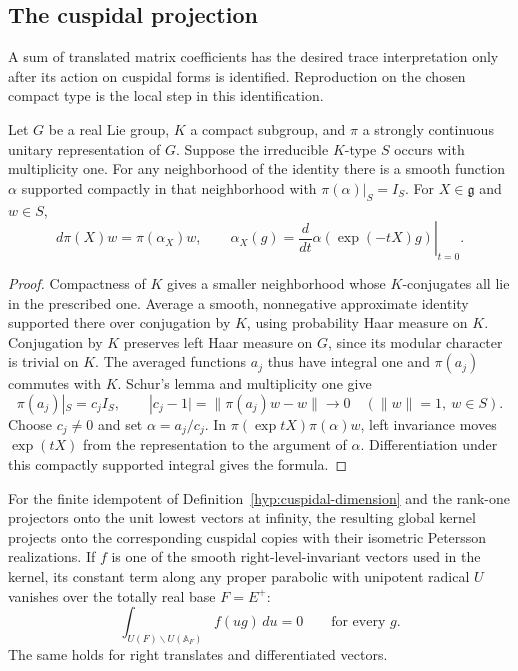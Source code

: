\subsection{The cuspidal projection}\label{sec:count-projection}

A sum of translated matrix coefficients has the desired trace interpretation only after its action on cuspidal forms is identified. Reproduction on the chosen compact type is the local step in this identification.

\begin{auxlemma}
\label{lem:compact-type-reproducer}
Let \(G\) be a real Lie group, \(K\) a compact subgroup, and \(\pi\)
a strongly continuous unitary representation of \(G\). Suppose the
irreducible \(K\)-type \(S\) occurs with multiplicity one.
For any neighborhood of the identity there is a smooth function
\(\alpha\) supported compactly in that neighborhood with
\(\pi(\alpha)|_S=I_S\). For \(X\in\mathfrak g\) and \(w\in S\),
\[
 d\pi(X)w=\pi(\alpha_X)w,\qquad
 \alpha_X(g)=\left.\frac{d}{dt}\alpha(\exp(-tX)g)\right|_{t=0}.
\]
\end{auxlemma}
\begin{proof}
Compactness of \(K\) gives a smaller neighborhood whose
\(K\)-conjugates all lie in the prescribed one. Average a smooth,
nonnegative approximate identity supported there over conjugation
by \(K\), using probability Haar measure on \(K\). Conjugation by
\(K\) preserves left Haar measure on \(G\), since its modular
character is trivial on \(K\). The averaged functions \(a_j\) thus
have integral one and \(\pi(a_j)\) commutes with \(K\). Schur's lemma
and multiplicity one give
\[
 \pi(a_j)|_S=c_j I_S,\qquad
 |c_j-1|=\|\pi(a_j)w-w\|\longrightarrow0\quad(\|w\|=1,\ w\in S).
\]
Choose \(c_j\ne0\) and set \(\alpha=a_j/c_j\). In
\(\pi(\exp tX)\pi(\alpha)w\), left invariance moves \(\exp(tX)\)
from the representation to the argument of \(\alpha\).
Differentiation under this compactly supported integral gives the
formula.
\end{proof}

\begin{proposition}
For the finite idempotent of Definition~\ref{hyp:cuspidal-dimension}
and the rank-one projectors onto the unit lowest vectors at infinity, the resulting global kernel projects
onto the corresponding cuspidal copies with their isometric
Petersson realizations. If \(f\) is one of the smooth right-level-invariant vectors used in the kernel, its constant term along any proper parabolic with unipotent radical \(U\) vanishes over the totally real base \(F=E^+\): 
\[
 \int_{U(F)\backslash U(\mathbb A_F)} f(ug)\,du=0\qquad\text{for every }g.
\]
 The same holds for right translates and differentiated vectors.
\end{proposition}

